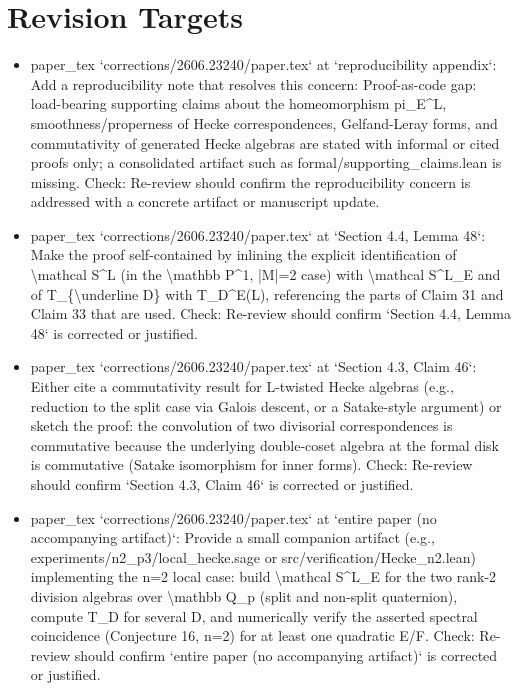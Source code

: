 \documentclass[11pt]{article}
\begin{document}
\section*{Revision Targets}
\begin{itemize}[leftmargin=*]
  \item [open] paper\_tex `corrections/2606.23240/paper.tex` at `reproducibility appendix`: Add a reproducibility note that resolves this concern: Proof-as-code gap: load-bearing supporting claims about the homeomorphism pi\_E\^{}L, smoothness/properness of Hecke correspondences, Gelfand-Leray forms, and commutativity of generated Hecke algebras are stated with informal or cited proofs only; a consolidated artifact such as formal/supporting\_claims.lean is missing. Check: Re-review should confirm the reproducibility concern is addressed with a concrete artifact or manuscript update.
  \item [open] paper\_tex `corrections/2606.23240/paper.tex` at `Section 4.4, Lemma 48`: Make the proof self-contained by inlining the explicit identification of \textbackslash{}mathcal S\^{}L (in the \textbackslash{}mathbb P\^{}1, |M|=2 case) with \textbackslash{}mathcal S\^{}L\_E and of T\_\{\textbackslash{}underline D\} with T\_D\^{}E(L), referencing the parts of Claim 31 and Claim 33 that are used. Check: Re-review should confirm `Section 4.4, Lemma 48` is corrected or justified.
  \item [open] paper\_tex `corrections/2606.23240/paper.tex` at `Section 4.3, Claim 46`: Either cite a commutativity result for L-twisted Hecke algebras (e.g., reduction to the split case via Galois descent, or a Satake-style argument) or sketch the proof: the convolution of two divisorial correspondences is commutative because the underlying double-coset algebra at the formal disk is commutative (Satake isomorphism for inner forms). Check: Re-review should confirm `Section 4.3, Claim 46` is corrected or justified.
  \item [open] paper\_tex `corrections/2606.23240/paper.tex` at `entire paper (no accompanying artifact)`: Provide a small companion artifact (e.g., experiments/n2\_p3/local\_hecke.sage or src/verification/Hecke\_n2.lean) implementing the n=2 local case: build \textbackslash{}mathcal S\^{}L\_E for the two rank-2 division algebras over \textbackslash{}mathbb Q\_p (split and non-split quaternion), compute T\_D for several D, and numerically verify the asserted spectral coincidence (Conjecture 16, n=2) for at least one quadratic E/F. Check: Re-review should confirm `entire paper (no accompanying artifact)` is corrected or justified.

\end{itemize}
\end{document}
